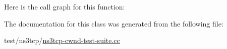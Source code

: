 Here is the call graph for this function\+:




The documentation for this class was generated from the following file\+:\begin{DoxyCompactItemize}
\item 
test/ns3tcp/\hyperlink{ns3tcp-cwnd-test-suite_8cc}{ns3tcp-\/cwnd-\/test-\/suite.\+cc}\end{DoxyCompactItemize}
